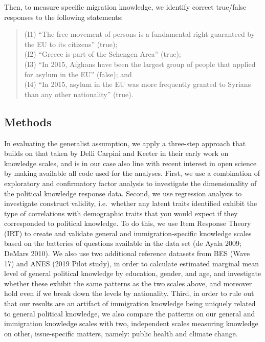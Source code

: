 \documentclass[11pt,halfline,a4paper,]{ouparticle}
\begin{document}
Then, to measure specific migration knowledge, we identify correct
true/false responses to the following statements:

\begin{quote}
(I1) ``The free movement of persons is a fundamental right guaranteed by
the EU to its citizens'' (true);\\
(I2) ``Greece is part of the Schengen Area'' (true);\\
(I3) ``In 2015, Afghans have been the largest group of people that
applied for asylum in the EU'' (false); and\\
(I4) ``In 2015, asylum in the EU was more frequently granted to Syrians
than any other nationality'' (true).
\end{quote}

\hypertarget{methods}{%
\subsection{Methods}\label{methods}}

In evaluating the generalist assumption, we apply a three-step approach
that builds on that taken by Delli Carpini and Keeter in their early
work on knowledge scales, and is in our case also line with recent
interest in open science by making available all code used for the
analyses. First, we use a combination of exploratory and confirmatory
factor analysis to investigate the dimensionality of the political
knowledge response data. Second, we use regression analysis to
investigate construct validity, i.e.~whether any latent traits
identified exhibit the type of correlations with demographic traits that
you would expect if they corresponded to political knowledge. To do
this, we use Item Response Theory (IRT) to create and validate general
and immigration-specific knowledge scales based on the batteries of
questions available in the data set (de Ayala 2009; DeMars 2010). We
also use two additional reference datasets from BES (Wave 17) and ANES
(2019 Pilot study), in order to calculate estimated marginal mean level
of general political knowledge by education, gender, and age, and
investigate whether these exhibit the same patterns as the two scales
above, and moreover hold even if we break down the levels by
nationality. Third, in order to rule out that our results are an
artifact of immigration knowledge being uniquely related to general
political knowledge, we also compare the patterns on our general and
immigration knowledge scales with two, independent scales measuring
knowledge on other, issue-specific matters, namely: public health and
climate change.
\end{document}
